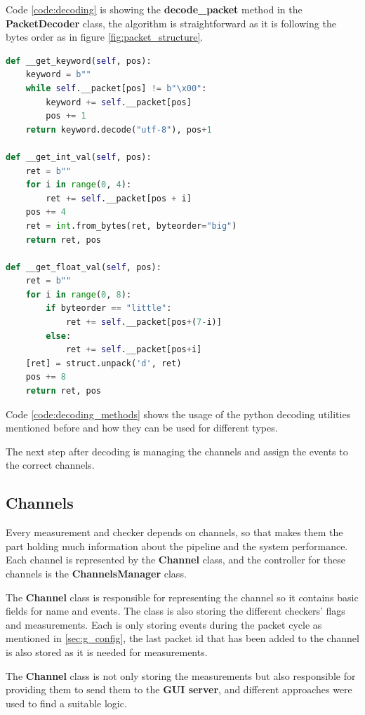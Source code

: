 Code \ref{code:decoding} is showing the \textbf{decode\_packet} method in the \textbf{PacketDecoder}
class, the algorithm is straightforward as it is following the bytes order as in figure \ref{fig:packet_structure}.
\newline
\begin{lstlisting}[language=python, label=code:decoding_methods, caption={helper methods in decoding},captionpos=b]
def __get_keyword(self, pos):
	keyword = b""
	while self.__packet[pos] != b"\x00":
		keyword += self.__packet[pos]
		pos += 1
	return keyword.decode("utf-8"), pos+1

def __get_int_val(self, pos):
	ret = b""
	for i in range(0, 4):
		ret += self.__packet[pos + i]
	pos += 4
	ret = int.from_bytes(ret, byteorder="big")
	return ret, pos

def __get_float_val(self, pos):
	ret = b""
	for i in range(0, 8):
		if byteorder == "little":
			ret += self.__packet[pos+(7-i)]
		else:
			ret += self.__packet[pos+i]
	[ret] = struct.unpack('d', ret)
	pos += 8
	return ret, pos
\end{lstlisting}

Code \ref{code:decoding_methods} shows the usage of the python decoding utilities mentioned before
and how they can be used for different types.

The next step after decoding is managing the channels and assign the events to the correct channels.

\subsection{Channels}
Every measurement and checker depends on channels, so that makes them the part holding much information
about the pipeline and the system performance. Each channel is represented by the \textbf{Channel} class,
and the controller for these channels is the \textbf{ChannelsManager} class.

The \textbf{Channel} class is responsible for representing the channel so it contains basic fields 
for name and events. The class is also storing the different checkers' flags and measurements. Each
is only storing events during the packet cycle as mentioned in \ref{sec:g_config}, the last packet id that
has been added to the channel is also stored as it is needed for measurements.

The \textbf{Channel} class is not only storing the measurements but also responsible for providing them
to send them to the \textbf{GUI server}, and different approaches were used to find a suitable logic.

